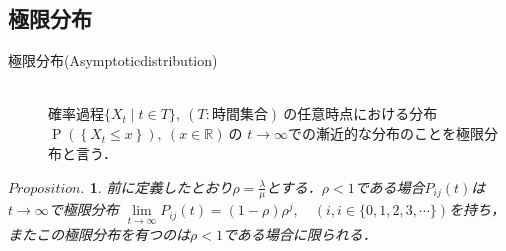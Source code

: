 \documentclass[a4j,papersize,disablejfam,slide,14pt]{jsarticle}
\newtheorem{Prop}{$Proposition.$}
\def\prob#1{\operatorname{P} \left(\left\{ #1 \right\}\right)} %
\begin{document}
\subsection{極限分布}
    \begin{screen}
    	\begin{description}
        	\item[極限分布{\rm (Asymptotic\quad distribution)}]\mbox{}\\
            	確率過程$\{ X_t \mid t \in T \},\ (T:\mbox{時間集合})\ $の任意時点における分布$\prob{X_t \leq x},\ (x \in \mathbb{R})\ $の
                $t \to \infty$での漸近的な分布のことを極限分布と言う．
        \end{description}
    \end{screen}
    \begin{screen}
    	\begin{Prop}
        \label{Prop:asymptotic_dist}
        	前に定義したとおり$\rho=\frac{\lambda}{\mu}$とする．$\rho < 1$である場合$P_{ij}(t)$は$t \to \infty$で極限分布
            $\lim\limits_{t \to \infty} P_{ij}(t) = (1-\rho)\rho^j, \quad (i,i \in \{ 0,1,2,3,\cdots \})$を持ち，またこの極限分布を有つのは$\rho < 1$である場合に限られる．
        \end{Prop}
    \end{screen}
\end{document}
